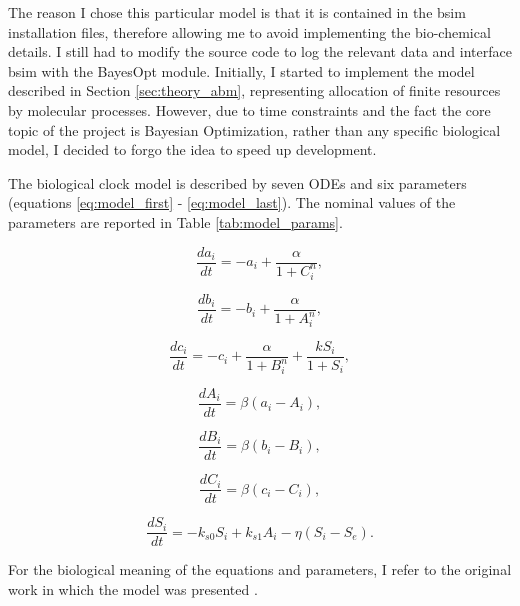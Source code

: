 \documentclass[bsc,frontabs,singlespacing,parskip,deptreport]{infthesis}
\begin{document}
The reason I chose this particular model is that it is contained in the bsim installation files, therefore allowing me to avoid implementing the bio-chemical details. I still had to modify the source code to log the relevant data and interface bsim with the BayesOpt module. Initially, I started to implement the model described in Section \ref{sec:theory_abm}, representing allocation of finite resources by molecular processes. However, due to time constraints and the fact the core topic of the project is Bayesian Optimization, rather than any specific biological model, I decided to forgo the idea to speed up development.

The biological clock model is described by seven ODEs and six parameters (equations \ref{eq:model_first} - \ref{eq:model_last}). The nominal values of the parameters are reported in Table \ref{tab:model_params}.

\begin{equation}\label{eq:model_first}
    \frac{da_{i}}{dt} = -a_{i} + \frac{\alpha}{1+C_{i}^{n}},
\end{equation}

\begin{equation}\label{}
    \frac{db_{i}}{dt} = -b_{i} + \frac{\alpha}{1+A_{i}^{n}},
\end{equation}

\begin{equation}\label{}
    \frac{dc_{i}}{dt} = -c_{i} + \frac{\alpha}{1+B_{i}^{n}} + \frac{kS_{i}}{1+S_{i}},
\end{equation}

\begin{equation}\label{}
    \frac{dA_{i}}{dt} = \beta (a_{i} - A_{i}),
\end{equation}

\begin{equation}\label{}
    \frac{dB_{i}}{dt} = \beta (b_{i} - B_{i}),
\end{equation}

\begin{equation}\label{}
    \frac{dC_{i}}{dt} = \beta (c_{i} - C_{i}),
\end{equation}

\begin{equation}\label{eq:model_last}
    \frac{dS_{i}}{dt} = -k_{s0}S_{i} + k_{s1}A_{i} - \eta(S_{i} - S_{e}).
\end{equation}

For the biological meaning of the equations and parameters, I refer to the original work in which the model was presented \cite{doi:10.1073/pnas.0307095101}.
\end{document}
